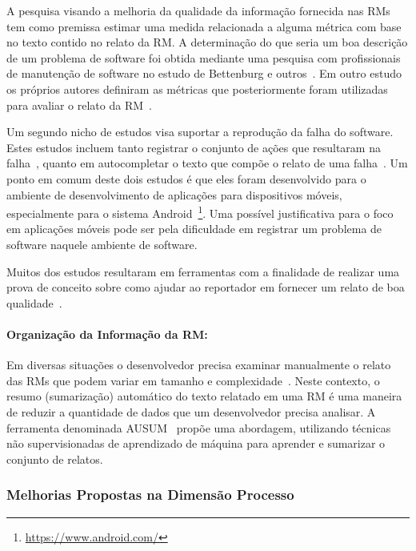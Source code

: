 A pesquisa visando a melhoria da qualidade da informação fornecida nas RMs tem
como premissa estimar uma medida relacionada a alguma métrica com base no texto
contido no relato da RM\@. A determinação do que seria um boa descrição de um
problema de software foi obtida mediante uma pesquisa com profissionais de
manutenção de software no estudo de Bettenburg e outros~\cite{Bettenburg2008a}.
Em outro estudo os próprios autores definiram as métricas que posteriormente
foram utilizadas para avaliar o relato da RM~\cite{Tu:2014:MQI:2677832.2677844}.

Um segundo nicho de estudos visa suportar a reprodução da falha do software.
Estes estudos incluem tanto registrar o conjunto de ações que resultaram na
falha~\cite{White:2015:GRR:2820282.2820291}, quanto em autocompletar o texto que
compõe o relato de uma falha~\cite{moran2015auto}. Um ponto em comum deste dois
estudos é que eles foram desenvolvido para o ambiente de desenvolvimento de
aplicações para dispositivos móveis, especialmente para o sistema
Android~\footnote{\url{https://www.android.com/}}. Uma possível justificativa
para o foco em aplicações móveis pode ser pela dificuldade em registrar um
problema de software naquele ambiente de software.


Muitos dos estudos resultaram em ferramentas com a finalidade de realizar uma
prova de conceito sobre como ajudar ao reportador em fornecer um relato de boa
qualidade~\cite{Tu:2014:MQI:2677832.2677844, Bettenburg2008a,
	Wu2011a,White:2015:GRR:2820282.2820291,moran2015auto}.

\paragraph{Organização da Informação da RM:}

Em diversas situações o desenvolvedor precisa examinar manualmente o relato das
RMs que podem variar em tamanho e complexidade~\cite{mani2012ausum}.  Neste
contexto, o resumo (sumarização) automático do texto relatado em uma RM é uma
maneira de reduzir a quantidade de dados que um desenvolvedor precisa analisar.
A ferramenta denominada AUSUM~\cite{mani2012ausum} propõe uma abordagem,
utilizando técnicas não supervisionadas de aprendizado de máquina para aprender
e sumarizar o conjunto de relatos.

\subsubsection{Melhorias Propostas na Dimensão Processo}
\label{ssub:melhorias_dim_processo}


